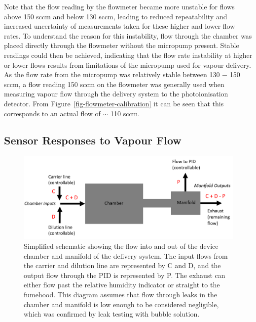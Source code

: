 \documentclass[
  a4paper,
]{scrbook}
\begin{document}
Note that the flow reading by the flowmeter became more unstable for
flows above 150 sccm and below 130 sccm, leading to reduced
repeatability and increased uncertainty of measurements taken for these
higher and lower flow rates. To understand the reason for this
instability, flow through the chamber was placed directly through the
flowmeter without the micropump present. Stable readings could then be
achieved, indicating that the flow rate instability at higher or lower
flows results from limitations of the micropump used for vapour
delivery. As the flow rate from the micropump was relatively stable
between 130 \(-\) 150 sccm, a flow reading 150 sccm on the flowmeter was
generally used when measuring vapour flow through the delivery system to
the photoionisation detector. From
Figure~\ref{fig-flowmeter-calibration} it can be seen that this
corresponds to an actual flow of \(\sim\) 110 sccm.

\hypertarget{sensor-responses-to-vapour-flow}{%
\subsection{Sensor Responses to Vapour
Flow}\label{sensor-responses-to-vapour-flow}}

\begin{figure}

{\centering \includegraphics[width=1\textwidth,height=\textheight]{figures/ch5/chamber-manifold-v2.png}

}

\caption{\label{fig-chamber-schematic}Simplified schematic showing the
flow into and out of the device chamber and manifold of the delivery
system. The input flows from the carrier and dilution line are
represented by C and D, and the output flow through the PID is
represented by P. The exhaust can either flow past the relative humidity
indicator or straight to the fumehood. This diagram assumes that flow
through leaks in the chamber and manifold is low enough to be considered
negligible, which was confirmed by leak testing with bubble solution.}

\end{figure}
\end{document}
